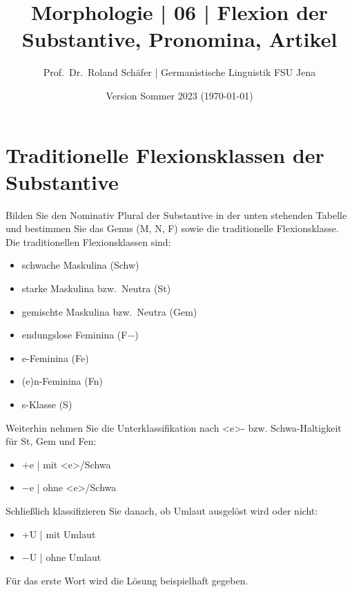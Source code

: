 \documentclass[12pt,a4paper,twoside]{article}
\author{Prof.\ Dr.\ Roland Schäfer | Germanistische Linguistik FSU Jena}
\title{Morphologie | 06 | Flexion der Substantive, Pronomina, Artikel}
\date{Version Sommer 2023 (\today)}
\newcommand{\Lf}{
  \setlength{\itemsep}{1pt}
  \setlength{\parskip}{0pt}
  \setlength{\parsep}{0pt}
}
\begin{document}
\maketitle

\section{Traditionelle Flexionsklassen der Substantive}

Bilden Sie den Nominativ Plural der Substantive in der unten stehenden Tabelle und bestimmen Sie das Genus (M, N, F) sowie die traditionelle Flexionsklasse.
Die traditionellen Flexionsklassen sind:

\begin{itemize}\Lf
  \item schwache Maskulina (Schw)
  \item starke Maskulina bzw.\ Neutra (St)
  \item gemischte Maskulina bzw.\ Neutra (Gem)
  \item endungslose Feminina (F$-$)
  \item e-Feminina (Fe)
  \item (e)n-Feminina (Fn)
  \item s-Klasse (S)
\end{itemize}

Weiterhin nehmen Sie die Unterklassifikation nach <e>- bzw. Schwa-Haltigkeit für St, Gem und Fen:

\begin{itemize}\Lf
  \item $+$e | mit <e>\slash Schwa
  \item $-$e | ohne <e>\slash Schwa
\end{itemize}

Schließlich klassifizieren Sie danach, ob Umlaut ausgelöst wird oder nicht:

\begin{itemize}\Lf
  \item $+$U | mit Umlaut
  \item $-$U | ohne Umlaut
\end{itemize}

Für das erste Wort wird die Lösung beispielhaft gegeben.
\end{document}
